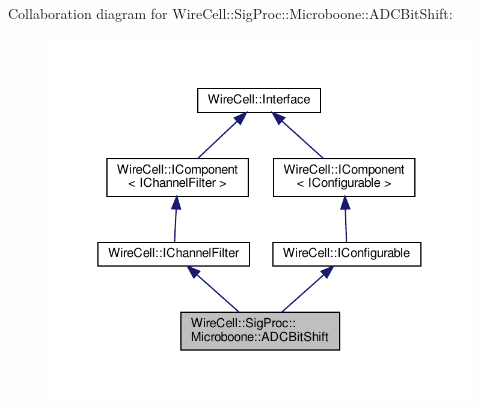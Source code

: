 Collaboration diagram for Wire\+Cell\+:\+:Sig\+Proc\+:\+:Microboone\+:\+:A\+D\+C\+Bit\+Shift\+:
\nopagebreak
\begin{figure}[H]
\begin{center}
\leavevmode
\includegraphics[width=338pt]{class_wire_cell_1_1_sig_proc_1_1_microboone_1_1_a_d_c_bit_shift__coll__graph}
\end{center}
\end{figure}
